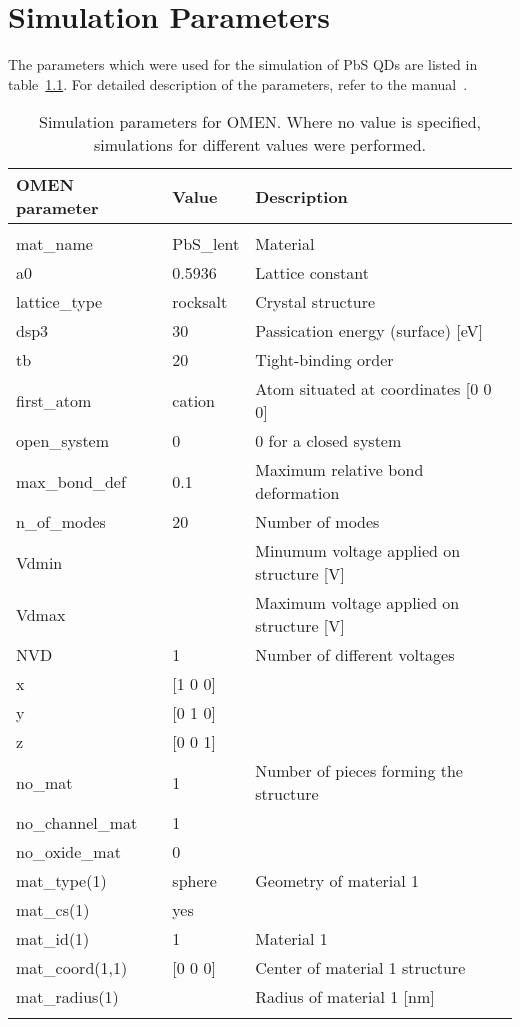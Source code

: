 \chapter{Simulation Parameters} \label{sec:SimPar}

The parameters which were used for the simulation of PbS QDs are listed in table~\ref{table:SimParams}. For detailed description of the \omen parameters, refer to the \omen manual~\cite{OMENmanual}.
\begin{table}[htbp]
\centering
\begin{tabular}{l l l}
	OMEN parameter & Value & Description\\
	\hline
	\\
	mat\_name		& PbS\_lent	& Material \\
	a0				& 0.5936	& Lattice constant \\
	lattice\_type	& rocksalt	& Crystal structure \\
	dsp3 			& 30		& Passication energy (surface) [eV] \\
	tb				& 20		& Tight-binding order \\
	first\_atom 	& cation 	& Atom situated at  coordinates [0 0 0] \\
	open\_system 	& 0 		& 0 for a closed system\\
	max\_bond\_def 	& 0.1 		& Maximum relative bond deformation \\
	n\_of\_modes	& 20		& Number of modes \\
	Vdmin			& 			& Minumum voltage applied on structure [V] \\
	Vdmax			& 			& Maximum voltage applied on structure [V] \\
	NVD				& 1			& Number of different voltages \\
	x				& [1 0 0]	& \\
	y				& [0 1 0] 	& \\
	z				& [0 0 1]	& \\
	no\_mat 		& 1			& Number of pieces forming the structure\\
	no\_channel\_mat& 1			&  \\
	no\_oxide\_mat 	& 0			&  \\
	mat\_type(1)	& sphere	& Geometry of material 1 \\
	mat\_cs(1)		& yes		& \\
	mat\_id(1)		& 1			& Material 1 \\
	mat\_coord(1,1)	& [0 0 0]	& Center of material 1 structure \\
	mat\_radius(1)	& 			& Radius of material 1 [nm] \\\\
\end{tabular}
\caption{Simulation parameters for OMEN. Where no value is specified, simulations for different values were performed.}
\label{table:SimParams}
\end{table}